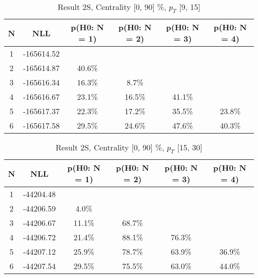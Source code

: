 \begin{table}[htb]
	\begin{center}
	\caption{Result 2S, Centrality [0, 90] \%, $p_{T}$ [9, 15] \GeV
}
{\footnotesize\renewcommand{\arraystretch}{1.4}
		\begin{tabular}{cc||>{\columncolor[gray]{0.8}}cccc}
			N & NLL & p(H0: N = 1) & p(H0: N = 2) & p(H0: N = 3) & p(H0: N = 4)\\ 
		\hline
1 & -165614.52 & & & &\\
2 & -165614.87 & 40.6\% & & &\\
3 & -165616.34 & 16.3\% & 8.7\% & &\\
4 & -165616.67 & 23.1\% & 16.5\% & 41.1\% &\\
5 & -165617.37 & 22.3\% & 17.2\% & 35.5\% & 23.8\%\\
6 & -165617.58 & 29.5\% & 24.6\% & 47.6\% & 40.3\% \\
	\end{tabular}
		\label{tab:lab}
	}
	\end{center}\end{table}

\begin{table}[htb]
	\begin{center}
	\caption{Result 2S, Centrality [0, 90] \%, $p_{T}$ [15, 30] \GeV
}
{\footnotesize\renewcommand{\arraystretch}{1.4}
		\begin{tabular}{cc||c>{\columncolor[gray]{0.8}}ccc}
			N & NLL & p(H0: N = 1) & p(H0: N = 2) & p(H0: N = 3) & p(H0: N = 4)\\ 
		\hline
1 & -44204.48 & & & &\\
2 & -44206.59 & 4.0\% & & &\\
3 & -44206.67 & 11.1\% & 68.7\% & &\\
4 & -44206.72 & 21.4\% & 88.1\% & 76.3\% &\\
5 & -44207.12 & 25.9\% & 78.7\% & 63.9\% & 36.9\%\\
6 & -44207.54 & 29.5\% & 75.5\% & 63.0\% & 44.0\% \\
	\end{tabular}
		\label{tab:lab}
	}
	\end{center}\end{table}


